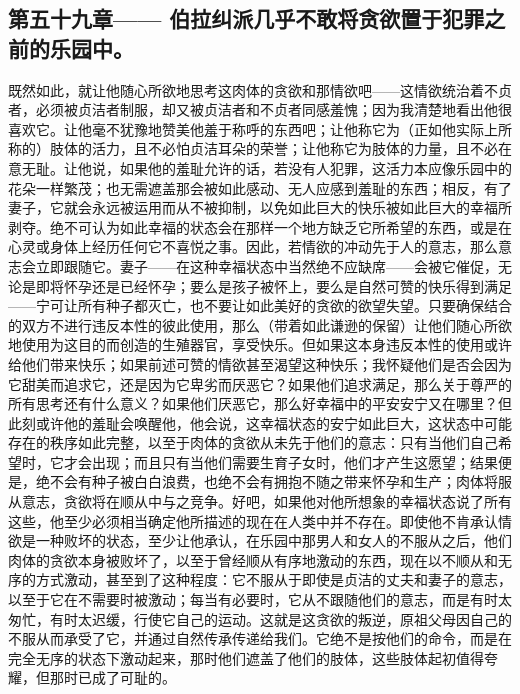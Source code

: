 
\subsection{第五十九章—— 伯拉纠派几乎不敢将贪欲置于犯罪之前的乐园中。}

既然如此，就让他随心所欲地思考这肉体的贪欲和那情欲吧——这情欲统治着不贞者，必须被贞洁者制服，却又被贞洁者和不贞者同感羞愧；因为我清楚地看出他很喜欢它。让他毫不犹豫地赞美他羞于称呼的东西吧；让他称它为（正如他实际上所称的）肢体的活力，且不必怕贞洁耳朵的荣誉；让他称它为肢体的力量，且不必在意无耻。让他说，如果他的羞耻允许的话，若没有人犯罪，这活力本应像乐园中的花朵一样繁茂；也无需遮盖那会被如此感动、无人应感到羞耻的东西；相反，有了妻子，它就会永远被运用而从不被抑制，以免如此巨大的快乐被如此巨大的幸福所剥夺。绝不可认为如此幸福的状态会在那样一个地方缺乏它所希望的东西，或是在心灵或身体上经历任何它不喜悦之事。因此，若情欲的冲动先于人的意志，那么意志会立即跟随它。妻子——在这种幸福状态中当然绝不应缺席——会被它催促，无论是即将怀孕还是已经怀孕；要么是孩子被怀上，要么是自然可赞的快乐得到满足——宁可让所有种子都灭亡，也不要让如此美好的贪欲的欲望失望。只要确保结合的双方不进行违反本性的彼此使用，那么（带着如此谦逊的保留）让他们随心所欲地使用为这目的而创造的生殖器官，享受快乐。但如果这本身违反本性的使用或许给他们带来快乐；如果前述可赞的情欲甚至渴望这种快乐；我怀疑他们是否会因为它甜美而追求它，还是因为它卑劣而厌恶它？如果他们追求满足，那么关于尊严的所有思考还有什么意义？如果他们厌恶它，那么好幸福中的平安安宁又在哪里？但此刻或许他的羞耻会唤醒他，他会说，这幸福状态的安宁如此巨大，这状态中可能存在的秩序如此完整，以至于肉体的贪欲从未先于他们的意志：只有当他们自己希望时，它才会出现；而且只有当他们需要生育子女时，他们才产生这愿望；结果便是，绝不会有种子被白白浪费，也绝不会有拥抱不随之带来怀孕和生产；肉体将服从意志，贪欲将在顺从中与之竞争。好吧，如果他对他所想象的幸福状态说了所有这些，他至少必须相当确定他所描述的现在在人类中并不存在。即使他不肯承认情欲是一种败坏的状态，至少让他承认，在乐园中那男人和女人的不服从之后，他们肉体的贪欲本身被败坏了，以至于曾经顺从有序地激动的东西，现在以不顺从和无序的方式激动，甚至到了这种程度：它不服从于即使是贞洁的丈夫和妻子的意志，以至于它在不需要时被激动；每当有必要时，它从不跟随他们的意志，而是有时太匆忙，有时太迟缓，行使它自己的运动。这就是这贪欲的叛逆，原祖父母因自己的不服从而承受了它，并通过自然传承传递给我们。它绝不是按他们的命令，而是在完全无序的状态下激动起来，那时他们遮盖了他们的肢体，这些肢体起初值得夸耀，但那时已成了可耻的。\par


